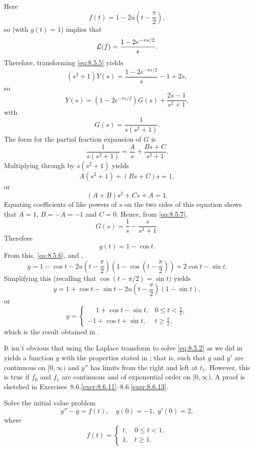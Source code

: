 \begin{solution}
Here
\[
f(t)=1-2u\left(t-\frac{\pi}{2}\right),
\]
so  (with $g(t)=1$) implies that
\[
{\mathcal L}(f)=\frac{1-2e^{-{\pi s/2}}}{s}.
\]
Therefore, transforming  \eqref{eq:8.5.5} yields
\[
(s^2+1)Y(s)=\frac{1-2e^{-{\pi s/ 2}}}{s}-1+2s,
\]
 so
\begin{equation}\label{eq:8.5.6}
Y(s)=(1-2e^{-{\pi s/ 2}}) G(s)+\frac{2s-1}{s^2+1},
\end{equation}
with
\[
G(s)=\frac{1}{s(s^2+1)}.
\]
The  form for the partial fraction expansion of $G$ is
\begin{equation}\label{eq:8.5.7}
\frac{1}{s(s^2+1)}=\frac{A}{s}+\frac{Bs+C}{s^2+1}.
\end{equation}
Multiplying through by $s(s^2+1)$ yields
\[
A(s^2+1)+(Bs+C)s=1,
\]
or
\[
(A+B)s^2+Cs+A=1.
\]
Equating coefficients of like powers of $s$ on the two sides of this
equation shows that $A=1$, $B=-A=-1$ and $C=0$. Hence, from
\eqref{eq:8.5.7},
\[
G(s)=\frac{1}{s}-\frac{s}{s^2+1}.
\]
Therefore
\[
g(t)=1-\cos t.
\]
From this,  \eqref{eq:8.5.6}, and
,
\[
y=1-\cos t-2u\left(t-\frac{\pi}{2}\right)\left(1-\cos\left(t-\frac{\pi}{2}\right)\right)+2\cos t-\sin t.
\]
Simplifying this (recalling that $\cos (t-\pi/2)=\sin t)$ yields
\[
y=1+\cos t-\sin t-2u\left(t-\frac{\pi}{2}\right)(1-\sin t),
\]
or
\[
y=\begin{cases}
\phantom{-}1+\cos t-\sin t,&0\le t<\frac{\pi}{2},\\
-1+\cos t+\sin t,&t\ge\frac{\pi}{2},
\end{cases}
\]
which is the result obtained in .
\end{solution}

\medskip
\begin{remark*}
It isn't obvious that using the Laplace transform to solve
\eqref{eq:8.5.2} as we did in  yields a function
$y$ with the properties stated in ; that is,
such that $y$ and $y'$ are continuous on $[0,\infty)$ and $y''$ has
limits from the right and left at $t_1$. However, this is
true if  $f_0$ and $f_1$ are continuous and of exponential order on
$[0,\infty)$. A proof  is sketched in
{Exercises~8.6.\ref{exer:8.6.11}}--8.6.\ref{exer:8.6.13}.
\end{remark*}


\begin{example}\label{example:8.5.3}
\space Solve the initial value problem
\begin{equation}\label{eq:8.5.8}
y''-y=f(t), \quad   y(0)=-1,\;  y'(0)=2,
\end{equation}
where
\[
f(t)=\begin{cases}
t,&0\le t<1,\\
1,&t\ge 1.
\end{cases}
\]
\end{example}

